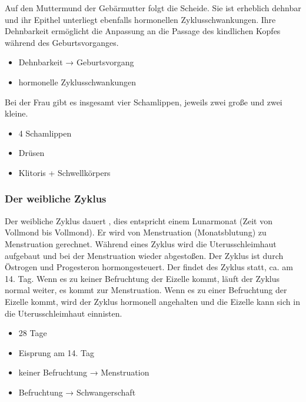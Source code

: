 {%
Auf den Muttermund der Gebärmutter folgt die Scheide. Sie
ist erheblich dehnbar und ihr Epithel unterliegt ebenfalls
hormonellen Zyklusschwankungen. Ihre Dehnbarkeit ermöglicht
die Anpassung an die Passage des kindlichen Kopfes während
des Geburtsvorganges.
}
{
\begin{itemize}
  \item Dehnbarkeit → Geburtsvorgang
  \item hormonelle Zyklusschwankungen
\end{itemize}
}{}{}{}


{%
Bei der Frau gibt es insgesamt vier Schamlippen, jeweils
zwei große und zwei kleine. 
}
{
\begin{itemize}
  \item 4 Schamlippen
  \item Drüsen
  \item Klitoris + Schwellkörpers
\end{itemize}
}{}{}{}

\subsubsection{Der weibliche Zyklus}
\label{topic:weiblicher-zyklus}

{%
Der weibliche Zyklus dauert , dies entspricht
einem Lunarmonat (Zeit von Vollmond bis Vollmond). Er wird
von Menstruation (Monatsblutung) zu Menstruation gerechnet.
Während eines Zyklus wird die Uterusschleimhaut aufgebaut
und bei der Menstruation wieder abgestoßen.
Der Zyklus ist durch Östrogen und Progesteron
hormongesteuert. Der  findet 
des Zyklus statt, ca. am 14. Tag. Wenn es zu keiner
Befruchtung der Eizelle kommt, läuft der Zyklus normal
weiter, es kommt zur Menstruation.
Wenn es zu einer Befruchtung der Eizelle kommt, wird der
Zyklus hormonell angehalten und die Eizelle kann sich in die
Uterusschleimhaut einnisten.
}{
\begin{itemize}
  \item 28 Tage
  \item Eisprung am 14. Tag 
  \item keiner Befruchtung → Menstruation
  \item Befruchtung → Schwangerschaft
\end{itemize}
}
{}{}{}



